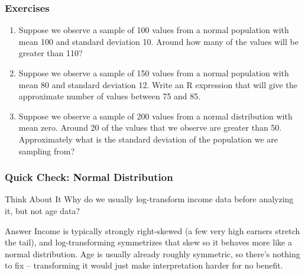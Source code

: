 \begin{frame}
\frametitle{Exercises}

\begin{enumerate}

\item Suppose we observe a sample of 100 values from a normal
 population with mean 100 and standard deviation 10.  Around how many
 of the values will be greater than 110?

\item Suppose we observe a sample of 150 values from a normal
 population with mean 80 and standard deviation 12.  Write an R
 expression that will give the approximate number of values between
 75 and 85.

\item Suppose we observe a sample of 200 values from a normal
 distribution with mean zero.  Around 20 of the values that we
 observe are greater than 50.  Approximately what is the standard
 deviation of the population we are sampling from?

\end{enumerate}

\end{frame}

\begin{frame}[fragile]\frametitle{Quick Check: Normal Distribution}
\begin{block}{Think About It}
Why do we usually log-transform income data before analyzing it, but not age data?
\end{block}
\pause
\begin{block}{Answer}
Income is typically strongly right-skewed (a few very high earners stretch the tail), and log-transforming symmetrizes that skew so it behaves more like a normal distribution. Age is usually already roughly symmetric, so there's nothing to fix -- transforming it would just make interpretation harder for no benefit.
\end{block}
\end{frame}
